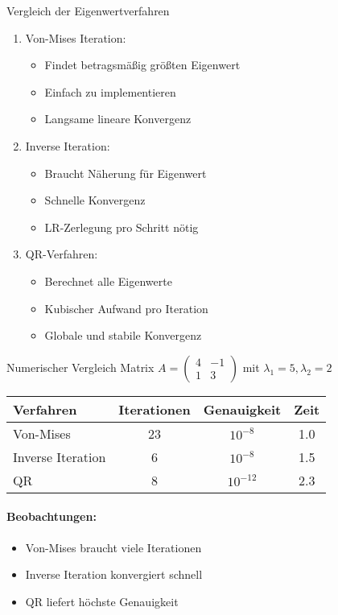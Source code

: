 \begin{KR}{Vergleich der Eigenwertverfahren}
\begin{enumerate}
    \item Von-Mises Iteration:
    \begin{itemize}
        \item Findet betragsmäßig größten Eigenwert
        \item Einfach zu implementieren
        \item Langsame lineare Konvergenz
    \end{itemize}
    
    \item Inverse Iteration:
    \begin{itemize}
        \item Braucht Näherung für Eigenwert
        \item Schnelle Konvergenz
        \item LR-Zerlegung pro Schritt nötig
    \end{itemize}
    
    \item QR-Verfahren:
    \begin{itemize}
        \item Berechnet alle Eigenwerte 
        \item Kubischer Aufwand pro Iteration
        \item Globale und stabile Konvergenz
    \end{itemize}
\end{enumerate}
\end{KR}

\begin{example2}{Numerischer Vergleich}
\small
Matrix $A = \begin{pmatrix} 4 & -1 \\ 1 & 3 \end{pmatrix}$ mit $\lambda_1 = 5, \lambda_2 = 2$
\begin{center}
\begin{tabular}{l|c|c|c}
Verfahren & Iterationen & Genauigkeit & Zeit\\
\hline
Von-Mises & 23 & $10^{-8}$ & 1.0\\
Inverse Iteration & 6 & $10^{-8}$ & 1.5\\  
QR & 8 & $10^{-12}$ & 2.3\\
\end{tabular}
\end{center}

\paragraph{Beobachtungen:}
\begin{itemize}
    \item Von-Mises braucht viele Iterationen
    \item Inverse Iteration konvergiert schnell
    \item QR liefert höchste Genauigkeit
\end{itemize}
\end{example2}

